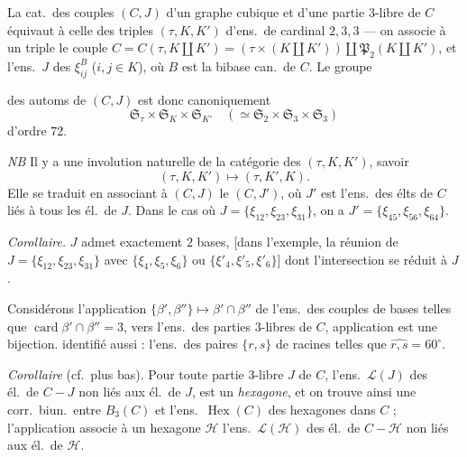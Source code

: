 \documentclass[11pt,a4paper]{article}
\begin{document}
La cat.\ des couples $(C,J)$ d'un graphe cubique et d'une partie $3$-libre de $C$ équivaut à celle des triples $(\tau,K,K')$ d'ens.\ de cardinal $2,3,3$ --- on associe à un triple le couple $C=C(\tau,K\amalg K')=(\tau\times(K\amalg K'))\amalg\mathfrak{P}_2(K\amalg K')$, et l'ens.\ $J$ des $\xi^B_{ij}$ ($i,j\in K$), où $B$ est la bibase can.\ de $C$. Le groupe

des automs de $(C,J)$ est donc canoniquement
\[
\mathfrak{S}_\tau\times\mathfrak{S}_K\times\mathfrak{S}_{K'}\quad(\simeq\mathfrak{S}_2\times\mathfrak{S}_3\times\mathfrak{S}_3)
\]
d'ordre $72$.

\emph{NB} Il y a une involution naturelle de la catégorie des $(\tau,K,K')$, savoir
\[
(\tau,K,K')\longmapsto(\tau,K',K).
\]
Elle se traduit en associant à $(C,J)$ le $(C,J')$, où $J'$ est l'ens.\ des élts de $C$ liés à tous les él.\ de $J$. Dans le cas où $J=\lbrace\xi_{12},\xi_{23},\xi_{31}\rbrace$, on a $J'=\lbrace\xi_{45},\xi_{56},\xi_{64}\rbrace$.

\emph{Corollaire.} $J$ admet exactement $2$ bases,   \struck{\ill{}} [dans l'exemple, la réunion de $J=\lbrace\xi_{12},\xi_{23},\xi_{31}\rbrace$ avec $\lbrace\xi_4,\xi_5,\xi_6\rbrace$ ou $\lbrace\xi'_4,\xi'_5,\xi'_6\rbrace$] dont l'intersection se réduit à $J$. 

Considérons l'application $\lbrace\beta',\beta''\rbrace\longmapsto\beta'\cap\beta''$ de l'ens.\ des couples de bases telles que $\operatorname{card}\beta'\cap\beta''=3$, vers l'ens.\ des parties $3$-libres de $C$, \ill{} application est une bijection. \ill{} identifié aussi : l'ens.\ des paires $\lbrace r,s\rbrace$ de racines telles que $\widehat{r,s}=60^\circ$.


\emph{Corollaire} (cf.\ plus bas). Pour toute partie $3$-libre $J$ de $C$, l'ens.\ $\mathcal{L}(J)$ des él.\ de $C-J$ non liés aux él.\ de $J$, est un \emph{hexagone}, et on trouve ainsi une corr.\ biun.\ entre $B_3(C)$ et l'ens.\ $\operatorname{Hex}(C)$ des hexagones dans $C$ ; l'application  associe à un hexagone $\mathcal{H}$ l'ens.\ $\mathcal{L}(\mathcal{H})$ des él.\ de $C-\mathcal{H}$ non liés aux él.\ de $\mathcal{H}$.
\end{document}
